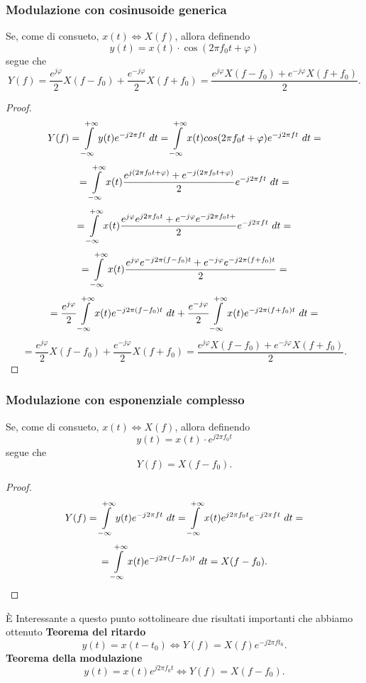 \documentclass[12pt,oneside,openany]{memoir}
\numberwithin{equation}{subsection}
\newcommand{\dt}{\ dt}
\begin{document}
\subsubsection{Modulazione con cosinusoide generica}
Se, come di consueto, $x(t) \iff X(f)$, allora definendo
\[
    y(t) = x(t) \cdot \cos(2 \pi f_0 t + \varphi)
\]
segue che
\[
    Y(f) = \frac{e^{j \varphi}}{2} X(f - f_0) + \frac{e^{-j \varphi}}{2}
    X(f + f_0) = \frac{e^{j \varphi} X(f - f_0) + e^{-j \varphi} X(f + f_0)}{2}.
\]
\begin{proof}
\[
    Y(f) = \int\displaylimits_{-\infty}^{+\infty} y(t) e^{-j 2 \pi f t} \dt =
    \int\displaylimits_{-\infty}^{+\infty} x(t) cos(2 \pi f_0 t + \varphi)
    e^{-j 2 \pi f t} \dt =
\]
\[
    = \int\displaylimits_{-\infty}^{+\infty} x(t)
    \frac{e^{j(2 \pi f_0 t + \varphi)} + e^{-j(2 \pi f_0 t + \varphi)}}{2} 
    e^{-j 2 \pi f t} \dt =
\]
\[
    = \int\displaylimits_{-\infty}^{+\infty} x(t) \frac{e^{j \varphi}
    e^{j 2 \pi f_0 t} + e^{-j \varphi} e^{-j 2 \pi f_0 t +}}{2}
    e^{-j 2 \pi f t} \dt =
\]
\[
    = \int\displaylimits_{-\infty}^{+\infty} x(t) \frac{e^{j \varphi}
    e^{-j 2 \pi (f - f_0) t} + e^{-j \varphi} e^{-j 2 \pi (f + f_0) t}}{2} =
\]
\[
    = \frac{e^{j \varphi}}{2} \int\displaylimits_{-\infty}^{+\infty} x(t)
    e^{-j 2 \pi (f - f_0) t} \dt + \frac{e^{-j \varphi}}{2}
    \int\displaylimits_{-\infty}^{+\infty} x(t) e^{-j 2 \pi (f + f_0) t} \dt =
\]
\[
    = \frac{e^{j \varphi}}{2} X(f - f_0) + \frac{e^{-j \varphi}}{2} X(f + f_0) =
    \frac{e^{j \varphi} X(f - f_0) + e^{-j \varphi} X(f + f_0)}{2}.
\]
\end{proof}


\newpage
\subsubsection{Modulazione con esponenziale complesso}
Se, come di consueto, $x(t) \iff X(f)$, allora definendo
\[
    y(t) = x(t) \cdot e^{j 2 \pi f_0 t}
\]
segue che
\[
    Y(f) = X(f - f_0).
\]
\begin{proof}
\[
    Y(f) = \int\displaylimits_{-\infty}^{+\infty} y(t) e^{-j 2 \pi f t} \dt =
    \int\displaylimits_{-\infty}^{+\infty} x(t) e^{j 2 \pi f_0 t}
    e^{-j 2 \pi f t} \dt = 
\]
\[
    = \int\displaylimits_{-\infty}^{+\infty} x(t) e^{-j 2 \pi (f - f_0) t} \dt
    = X(f - f_0).
\]
\end{proof}
\`E Interessante a questo punto sottolineare due risultati importanti che
abbiamo ottenuto
\bigbreak
\textbf{Teorema del ritardo}
\[
    y(t) = x(t - t_0) \iff Y(f) = X(f) e^{-j 2 \pi f t_0}.
\]
\bigbreak
\textbf{Teorema della modulazione}
\[
    y(t) = x(t) e^{j 2 \pi f_0 t} \iff Y(f) = X(f - f_0).
\]
\end{document}
